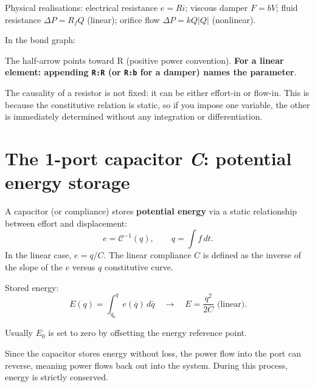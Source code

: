 Physical realisations: electrical resistance $e=Ri$; viscous damper $F=bV$; fluid resistance $\Delta P = R_f Q$ (linear); orifice flow $\Delta P = k Q|Q|$ (nonlinear). 

In the bond graph:
\begin{center}
\end{center}
The half-arrow points toward R (positive power convention). \textbf{For a linear element: appending \texttt{R:R} (or \texttt{R:b} for a damper) names the parameter}.


\begin{insightbox}[Causality of R]
The causality of a resistor is not fixed: it can be either effort-in or flow-in. This is because the constitutive relation is static, so if you impose one variable, the other is immediately determined without any integration or differentiation.
\end{insightbox}

\section{The 1-port capacitor \textit{C}: potential energy storage}

A capacitor (or compliance) stores \textbf{potential energy} via a static relationship between effort and displacement:
\begin{equation}
  e = \mathcal{C}^{-1}(q), \qquad q = \int f\,dt.
\end{equation}
In the linear case, $e = q/C$. The linear compliance $C$ is defined as the inverse of the slope of the $e$ versus $q$ constitutive curve.

Stored energy:
\begin{equation}
  E(q) = \int_{q_0}^q e(\bar{q})\,d\bar{q} \quad\longrightarrow\quad E = \frac{q^2}{2C} \text{ (linear)}.
\end{equation}

Usually $E_0$ is set to zero by offsetting the energy reference point.

Since the capacitor stores energy without loss, the power flow into the port can reverse, meaning power flows back out into the system. During this process, energy is strictly conserved.

